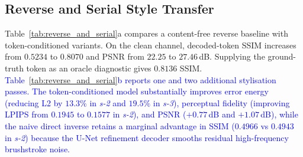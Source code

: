 \documentclass[runningheads]{llncs}
\newcommand{\revised}[1]{\textcolor{blue}{#1}}
\begin{document}
\subsection{Reverse and Serial Style Transfer}
\label{sec:exp_reverse}
Table~\ref{tab:reverse_and_serial}a compares a content-free reverse baseline with token-conditioned variants. On the clean channel, decoded-token SSIM increases from $0.5234$ to $0.8070$ and PSNR from $22.25$ to $27.46$\,dB. Supplying the ground-truth token as an oracle diagnostic gives $0.8136$ SSIM. \revised{Table~\ref{tab:reverse_and_serial}b reports one and two additional stylisation passes. The token-conditioned model substantially improves error energy (reducing L2 by $13.3\%$ in \emph{s-2} and $19.5\%$ in \emph{s-3}), perceptual fidelity (improving LPIPS from $0.1945$ to $0.1577$ in \emph{s-2}), and PSNR ($+0.77$\,dB and $+1.07$\,dB), while the naive direct inverse retains a marginal advantage in SSIM ($0.4966$ vs $0.4943$ in \emph{s-2}) because the U-Net refinement decoder smooths residual high-frequency brushstroke noise.}
\end{document}
